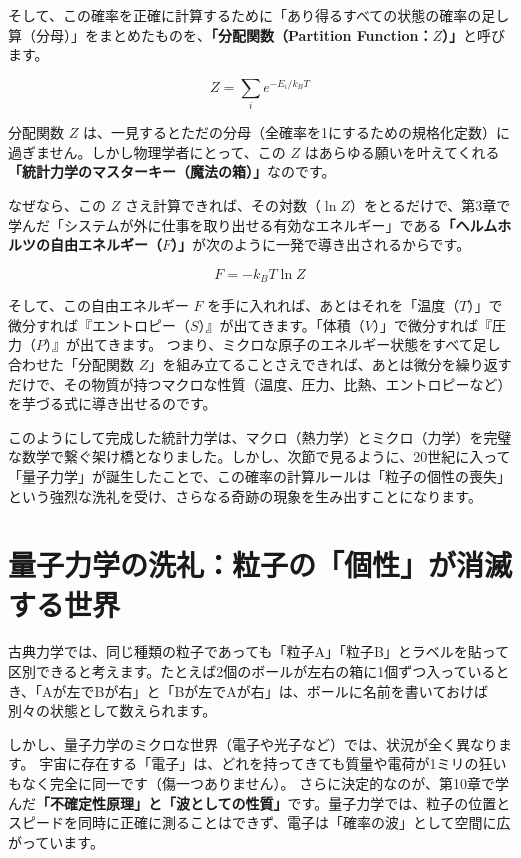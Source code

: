 そして、この確率を正確に計算するために「あり得るすべての状態の確率の足し算（分母）」をまとめたものを、\textbf{「分配関数（Partition Function：\(Z\)）」}と呼びます。

\[
Z = \sum_i e^{-E_i/k_B T}
\]

分配関数 \(Z\) は、一見するとただの分母（全確率を1にするための規格化定数）に過ぎません。しかし物理学者にとって、この \(Z\) はあらゆる願いを叶えてくれる\textbf{「統計力学のマスターキー（魔法の箱）」}なのです。

なぜなら、この \(Z\) さえ計算できれば、その対数（\(\ln Z\)）をとるだけで、第3章で学んだ「システムが外に仕事を取り出せる有効なエネルギー」である\textbf{「ヘルムホルツの自由エネルギー（\(F\)）」}が次のように一発で導き出されるからです。

\[
F = -k_B T \ln Z
\]

そして、この自由エネルギー \(F\) を手に入れれば、あとはそれを「温度（\(T\)）」で微分すれば『エントロピー（\(S\)）』が出てきます。「体積（\(V\)）」で微分すれば『圧力（\(P\)）』が出てきます。 つまり、ミクロな原子のエネルギー状態をすべて足し合わせた「分配関数 \(Z\)」を組み立てることさえできれば、あとは微分を繰り返すだけで、その物質が持つマクロな性質（温度、圧力、比熱、エントロピーなど）を芋づる式に導き出せるのです。

このようにして完成した統計力学は、マクロ（熱力学）とミクロ（力学）を完璧な数学で繋ぐ架け橋となりました。しかし、次節で見るように、20世紀に入って「量子力学」が誕生したことで、この確率の計算ルールは「粒子の個性の喪失」という強烈な洗礼を受け、さらなる奇跡の現象を生み出すことになります。

\section{量子力学の洗礼：粒子の「個性」が消滅する世界}

古典力学では、同じ種類の粒子であっても「粒子A」「粒子B」とラベルを貼って区別できると考えます。たとえば2個のボールが左右の箱に1個ずつ入っているとき、「Aが左でBが右」と「Bが左でAが右」は、ボールに名前を書いておけば別々の状態として数えられます。

しかし、量子力学のミクロな世界（電子や光子など）では、状況が全く異なります。 宇宙に存在する「電子」は、どれを持ってきても質量や電荷が1ミリの狂いもなく完全に同一です（傷一つありません）。 さらに決定的なのが、第10章で学んだ\textbf{「不確定性原理」と「波としての性質」}です。量子力学では、粒子の位置とスピードを同時に正確に測ることはできず、電子は「確率の波」として空間に広がっています。

